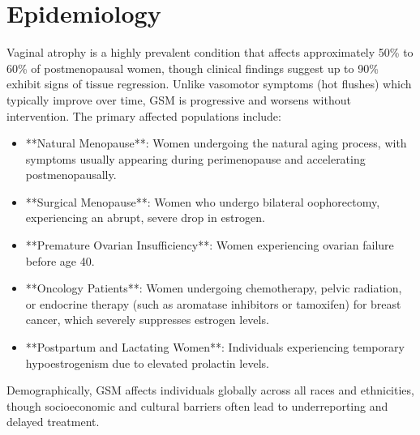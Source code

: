 \section*{Epidemiology}
Vaginal atrophy is a highly prevalent condition that affects approximately 50\% to 60\% of postmenopausal women, though clinical findings suggest up to 90\% exhibit signs of tissue regression. Unlike vasomotor symptoms (hot flushes) which typically improve over time, GSM is progressive and worsens without intervention.
The primary affected populations include:
\begin{itemize}
\item **Natural Menopause**: Women undergoing the natural aging process, with symptoms usually appearing during perimenopause and accelerating postmenopausally.
\item **Surgical Menopause**: Women who undergo bilateral oophorectomy, experiencing an abrupt, severe drop in estrogen.
\item **Premature Ovarian Insufficiency**: Women experiencing ovarian failure before age 40.
\item **Oncology Patients**: Women undergoing chemotherapy, pelvic radiation, or endocrine therapy (such as aromatase inhibitors or tamoxifen) for breast cancer, which severely suppresses estrogen levels.
\item **Postpartum and Lactating Women**: Individuals experiencing temporary hypoestrogenism due to elevated prolactin levels.
\end{itemize}
Demographically, GSM affects individuals globally across all races and ethnicities, though socioeconomic and cultural barriers often lead to underreporting and delayed treatment.


